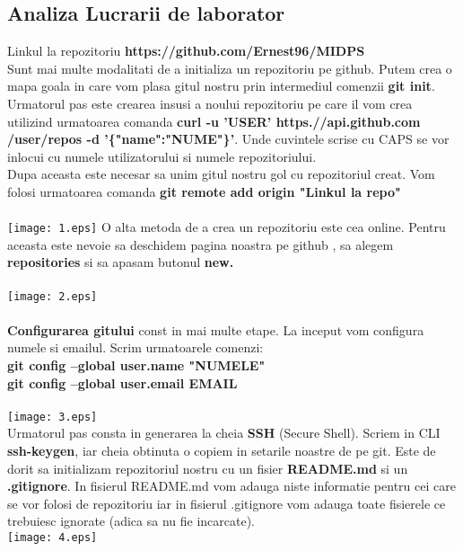\subsection{Analiza Lucrarii de laborator}
\tab Linkul la repozitoriu \textbf{https://github.com/Ernest96/MIDPS}\\
Sunt mai multe modalitati de a initializa un repozitoriu pe github.
Putem crea o mapa goala in care vom plasa gitul nostru prin intermediul comenzii \textbf{git init}.\\
\tab Urmatorul pas este crearea insusi a noului repozitoriu pe care il vom crea utilizind urmatoarea comanda
\textbf{curl -u 'USER' https.//api.github.com\\/user/repos -d '\{"name":"NUME"\}'}. Unde cuvintele scrise cu CAPS
se vor inlocui cu numele utilizatorului si numele repozitoriului.\\
\tab Dupa aceasta este necesar sa unim gitul nostru gol cu repozitoriul creat.
Vom folosi urmatoarea comanda \textbf{git remote add origin "Linkul la repo"}\\
\\
\texttt{[image: 1.eps]}
\clearpage
\tab O alta metoda de a crea un repozitoriu este cea online.
Pentru aceasta este nevoie sa deschidem pagina noastra pe github , sa alegem \textbf{repositories} si sa apasam butonul \textbf{new.}\\
\\
\texttt{[image: 2.eps]}
\\
\\
\tab \textbf{Configurarea gitului} const in mai multe etape. La inceput vom configura numele si emailul.
Scrim urmatoarele comenzi:\\
\textbf{git config --global user.name "NUMELE"}\\
\textbf{git config --global user.email EMAIL}\\
\\
\texttt{[image: 3.eps]}\\
\tab Urmatorul pas consta in generarea la cheia \textbf{SSH} (Secure Shell). Scriem in CLI \textbf{ssh-keygen},
iar cheia obtinuta o copiem in setarile noastre de pe git.
\tab Este de dorit sa initializam repozitoriul nostru cu un fisier \textbf{README.md} si un \textbf{.gitignore}. In fisierul
README.md vom adauga niste informatie pentru cei care se vor folosi de repozitoriu iar in fisierul .gitignore vom adauga
toate fisierele ce trebuiesc ignorate (adica sa nu fie incarcate).\\
\texttt{[image: 4.eps]}
\clearpage
